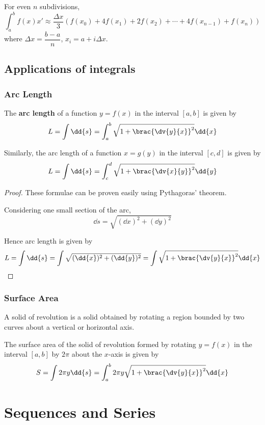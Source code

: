 For even $n$ subdivisions,
\begin{equation}
\int_a^bf(x)x' \approx \frac {\Delta x}{3} (f(x_0) + 4f(x_1) + 2f(x_2) + \cdots + 4f(x_{n-1} )+ f(x_n))
\end{equation}
where $\Delta x = \dfrac{b-a}{n}$, $x_i =a+ i\Delta x$.

\section{Applications of integrals}
\subsection{Arc Length}
The \textbf{arc length} of a function $y=f(x)$ in the interval $[a,b]$ is given by
\begin{equation}
L = \int\dd{s} = \int_a^b\sqrt{1+\brac{\dv{y}{x}}^2}\dd{x}
\end{equation}

Similarly, the arc length of a function $x=g(y)$ in the interval $[c,d]$ is given by
\[ L = \int\dd{s} = \int_c^d\sqrt{1+\brac{\dv{x}{y}}^2}\dd{y} \]

\begin{proof}
These formulae can be proven easily using Pythagoras' theorem.

Considering one small section of the arc,
\[ \dd{s}=\sqrt{(\dd{x})^2+(\dd{y})^2} \]

Hence arc length is given by
\[ L = \int\dd{s} = \int\sqrt{(\dd{x})^2+(\dd{y})^2} = \int\sqrt{1+\brac{\dv{y}{x}}^2}\dd{x} \]
\end{proof}

\subsection{Surface Area}
A solid of revolution is a solid obtained by rotating a region bounded by two curves about a vertical or horizontal axis.

The surface area of the solid of revolution formed by rotating $y=f(x)$ in the interval $[a,b]$ by $2\pi$ about the $x$-axis is given by
\begin{equation}
S = \int2\pi y\dd{s} = \int_a^b 2\pi y \sqrt{1+\brac{\dv{y}{x}}^2}\dd{x}
\end{equation}

\chapter{Sequences and Series}
